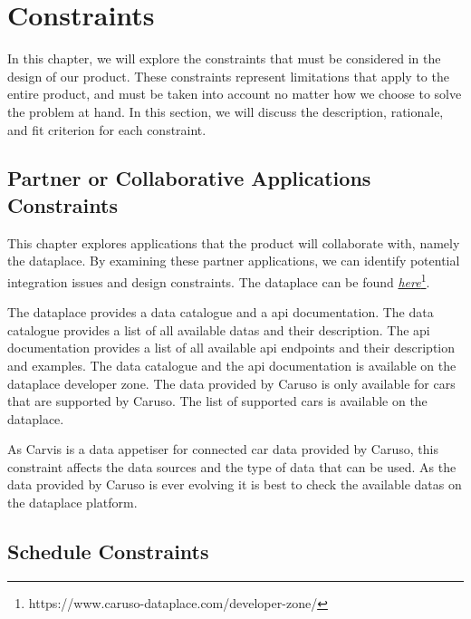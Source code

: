 \chapter{Constraints}

In this chapter, we will explore the constraints that must be considered in the design of our product. These constraints represent limitations that apply to the entire product, and must be taken into account no matter how we choose to solve the problem at hand. In this section, we will discuss the description, rationale, and fit criterion for each constraint.

\section{Partner or Collaborative Applications Constraints}

This chapter explores applications that the product will collaborate with, namely the \gls{dataplace}. By examining these partner applications, we can identify potential integration issues and design constraints. The dataplace can be found \href{https://www.caruso-dataplace.com/developer-zone/}{\emph{here}}\footnote{https://www.caruso-dataplace.com/developer-zone/}.

The \gls{dataplace} provides a data catalogue and a \gls{api} documentation. The data catalogue provides a list of all available \glspl{data} and their description. The \gls{api} documentation provides a list of all available \gls{api} endpoints and their description and examples. The data catalogue and the \gls{api} documentation is available on the \gls{dataplace} developer zone. The data provided by Caruso is only available for cars that are supported by Caruso. The list of supported cars is available on the \gls{dataplace}.

As Carvis is a data appetiser for connected car data provided by Caruso, this constraint affects the data sources and the type of data that can be used. As the data provided by Caruso is ever evolving it is best to check the available \glspl{data} on the \gls{dataplace} platform. 

\section{Schedule Constraints}

